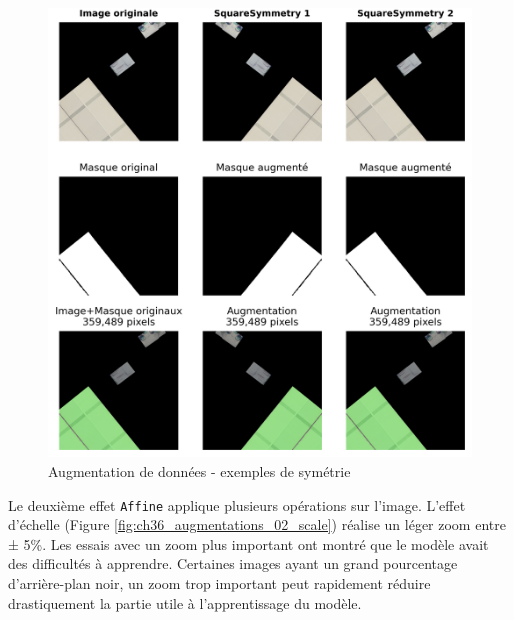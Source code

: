 \begin{figure}[H]
    \centering
    \includegraphics[width=1\linewidth]{02-main/figures/ch3/ch36_augmentations_01_squaresymmetry.png}
    \caption{Augmentation de données - exemples de symétrie}
    \label{fig:ch36_augmentations_01_squaresymmetry}
\end{figure}

\newpage
Le deuxième effet \texttt{Affine} applique plusieurs opérations sur l'image. L'effet d'échelle (Figure \ref{fig:ch36_augmentations_02_scale}) réalise un léger zoom entre ± 5\%. Les essais avec un zoom plus important ont montré que le modèle avait des difficultés à apprendre. Certaines images ayant un grand pourcentage d'arrière-plan noir, un zoom trop important peut rapidement réduire drastiquement la partie utile à l'apprentissage du modèle.

